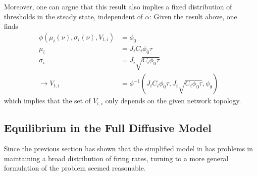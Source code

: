 \documentclass[10pt,a4paper]{article}
\begin{document}
Moreover, one can argue that this result also implies a fixed distribution of thresholds in the steady state, independent of $\alpha$: Given the result above, one finds
\begin{align}
\phi \left( \mu_i(\nu),\sigma_i \left( \nu \right) ,V_{t,i} \right) &= \phi_0 \label{fixed_thresh_dist_argument1} \\
\mu_i &= J_iC_i \phi_0 \tau \label{fixed_thresh_dist_argument2} \\
\sigma_i &= J_i\sqrt{C_i \phi_0  \tau} \label{fixed_thresh_dist_argument3} \\
\rightarrow V_{t,i} &= {\phi}^{-1} \left( J_iC_i \phi_0 \tau,J_i\sqrt{C_i \phi_0  \tau},\phi_0 \right) \label{fixed_thresh_dist_argument4}
\end{align}
which implies that the set of $V_{t,i}$ only depends on the given network topology.

\subsection{Equilibrium in the Full Diffusive Model} \label{Matrix_Diff_Model_Section}
Since the previous section has shown that the simplified model in \cite{Sweeney_Paper} has problems in maintaining a broad distribution of firing rates, turning to a more general formulation of the problem seemed reasonable.
\end{document}
